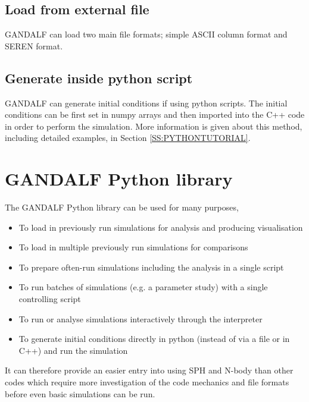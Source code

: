 \documentclass[a4paper]{article}
\begin{document}
\subsection{Load from external file}
GANDALF can load two main file formats; simple ASCII column format and SEREN format.

\subsection{Generate inside python script}
GANDALF can generate initial conditions if using python scripts.  The initial conditions can be first set in numpy arrays and then imported into the C++ code in order to perform the simulation.  More information is given about this method, including detailed examples, in Section \ref{SS:PYTHONTUTORIAL}.


\newpage



\section{GANDALF Python library} \label{S:PYTHONSCRIPT}

The GANDALF Python library can be used for many purposes,
\begin{itemize}
\item To load in previously run simulations for analysis and producing visualisation
\item To load in multiple previously run simulations for comparisons
\item To prepare often-run simulations including the analysis in a single script
\item To run batches of simulations (e.g. a parameter study) with a single controlling script
\item To run or analyse simulations interactively through the interpreter
\item To generate initial conditions directly in python (instead of via a file or in C++) and run the simulation
\end{itemize}
It can therefore provide an easier entry into using SPH and N-body than other codes which require more investigation of the code mechanics and file formats before even basic simulations can be run.

\end{document}
